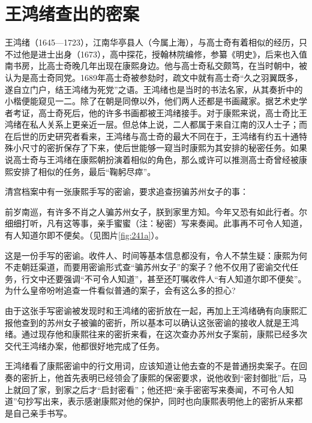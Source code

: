 \section{王鸿绪查出的密案}


王鸿绪（1645—1723），江南华亭县人（今属上海），与高士奇有着相似的经历，只不过他是进士出身（1673），高中探花，授翰林院编修，参纂《明史》，后来也入值南书房，比高士奇晚几年出现在康熙身边。他与高士奇私交颇笃，在当时朝中，被认为是高士奇同党。1689年高士奇被参劾时，疏文中就有高士奇“久之羽翼既多，遂自立门户，结王鸿绪为死党”之语。王鸿绪也是当时的书法名家，从其奏折中的小楷便能窥见一二。除了在朝是同僚以外，他们两人还都是书画藏家。据艺术史学者考证，高士奇死后，他的许多书画都被王鸿绪接手。对于康熙来说，高士奇比王鸿绪在私人关系上更亲近一层。但总体上说，二人都属于来自江南的汉人士子；而在后世的历史研究者看来，王鸿绪与高士奇的最大不同在于，王鸿绪有约五十通特殊小尺寸的密折保存了下来，使后世能够一窥当时康熙为其安排的秘密任务。如果说高士奇与王鸿绪在康熙朝扮演着相似的角色，那么或许可以推测高士奇曾经被康熙安排了相似的任务，最后“鞠躬尽瘁”。



清宫档案中有一张康熙手写的密谕，要求追查拐骗苏州女子的事：



\begin{bookquote}前岁南巡，有许多不肖之人骗苏州女子，朕到家里方知。今年又恐有如此行者。尔细细打听，凡有这等事，亲手蜜蜜（注：秘密）写来奏闻。此事再不可令人知道，有人知道尔即不便矣。（见图片\ref{fig:241a}）。\end{bookquote}


这是一份手写的密谕。收件人、时间等基本信息都没有，令人不禁生疑：康熙为何不走朝廷渠道，而要用密谕形式查“骗苏州女子”的案子？他不仅用了密谕交代任务，行文中还要强调“不可令人知道”，甚至还叮嘱收件人“有人知道尔即不便矣”。为什么皇帝吩咐追查一件看似普通的案子，会有这么多的担心?



由于这张手写密谕被发现时和王鸿绪的密折放在一起，再加上王鸿绪确有向康熙汇报他查到的苏州女子被骗的密折，所以基本可以确认这张密谕的接收人就是王鸿绪。通过现存他和康熙往来的密折来看，在这次查办苏州女子案前，康熙已经多次交代王鸿绪办案，他都很好地完成了任务。



王鸿绪看了康熙密谕中的行文用词，应该知道让他去查的不是普通拐卖案子。在回奏的密折上，他首先表明已经领会了康熙的保密要求，说他收到“密封御批”后，马上就回了家，到家之后才“启封密看”；他还把“亲手密密写来奏闻，不可令人知道”句抄写出来，表示感谢康熙对他的保护，同时也向康熙表明他上的密折从来都是自己亲手书写。



